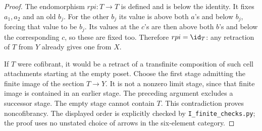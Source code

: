 \begin{proof}
The endomorphism $rpi:T\to T$ is defined and is below the identity.
It fixes $a_1,a_2$ and an old $b_j$. For the other $b_j$ its value is
above both $a$'s and below $b_j$, forcing that value to be $b_j$.
Its values at the $c$'s are then above both $b$'s and below the
corresponding $c$, so these are fixed too. Therefore $rpi=\id_T$:
any retraction of $T$ from $Y$ already gives one from $X$.

If $T$ were cofibrant, it would be a retract of a transfinite
composition of such cell attachments starting at the empty poset.
Choose the first stage admitting the finite image of the section
$T\to Y$. It is not a nonzero limit stage, since that finite image
is contained in an earlier stage. The preceding argument excludes a
successor stage. The empty stage cannot contain $T$. This
contradiction proves noncofibrancy. The displayed order is explicitly
checked by \texttt{I\_finite\_checks.py}; the proof uses no unstated
choice of arrows in the six-element category.
\end{proof}


